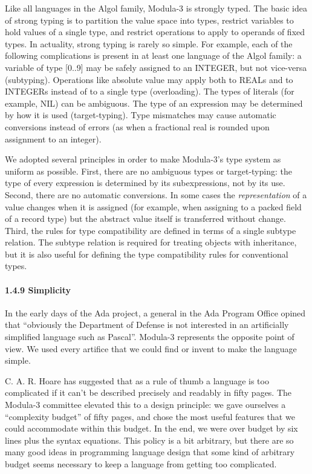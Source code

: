 \documentclass[10pt]{article}
\begin{document}
Like all languages in the Algol family, Modula-3 is strongly typed. The basic
idea of strong typing is to partition the value space into types, restrict
variables to hold values of a single type, and restrict operations to apply to
operands of fixed types. In actuality, strong typing is rarely so simple. For
example, each of the following complications is present in at least one
language of the Algol family: a variable of type [0..9] may be safely assigned
to an INTEGER, but not vice-versa (subtyping). Operations like absolute value
may apply both to REALs and to INTEGERs instead of to a single type
(overloading). The types of literals (for example, NIL) can be ambiguous. The
type of an expression may be determined by how it is used
(target-typing). Type mismatches may cause automatic conversions instead of
errors (as when a fractional real is rounded upon assignment to an integer).

We adopted several principles in order to make Modula-3's type system as
uniform as possible. First, there are no ambiguous types or target-typing: the
type of every expression is determined by its subexpressions, not by its
use. Second, there are no automatic conversions. In some cases the
\emph{representation} of a value changes when it is assigned (for example,
when assigning to a packed field of a record type) but the abstract value
itself is transferred without change. Third, the rules for type compatibility
are defined in terms of a single subtype relation. The subtype relation is
required for treating objects with inheritance, but it is also useful for
defining the type compatibility rules for conventional types.

\paragraph{1.4.9 Simplicity}

In the early days of the Ada project, a general in the Ada Program Office
opined that ``obviously the Department of Defense is not interested in an
artificially simplified language such as Pascal''. Modula-3 represents the
opposite point of view. We used every artifice that we could find or invent to
make the language simple.

C. A. R. Hoare has suggested that as a rule of thumb a language is too
complicated if it can't be described precisely and readably in fifty
pages. The Modula-3 committee elevated this to a design principle: we gave
ourselves a ``complexity budget'' of fifty pages, and chose the most useful
features that we could accommodate within this budget. In the end, we were
over budget by six lines plus the syntax equations. This policy is a bit
arbitrary, but there are so many good ideas in programming language design
that some kind of arbitrary budget seems necessary to keep a language from
getting too complicated.
\end{document}
